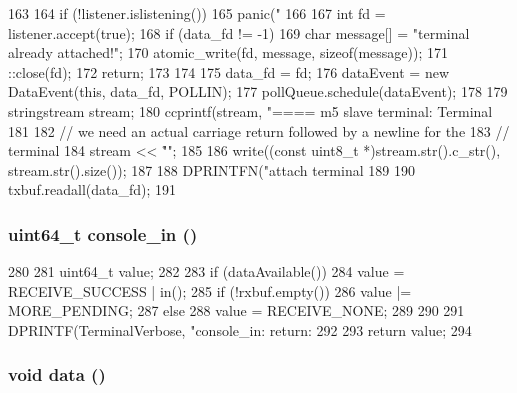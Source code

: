 \begin{DoxyCode}
163 {
164     if (!listener.islistening())
165         panic("%
166 
167     int fd = listener.accept(true);
168     if (data_fd != -1) {
169         char message[] = "terminal already attached!\n";
170         atomic_write(fd, message, sizeof(message));
171         ::close(fd);
172         return;
173     }
174 
175     data_fd = fd;
176     dataEvent = new DataEvent(this, data_fd, POLLIN);
177     pollQueue.schedule(dataEvent);
178 
179     stringstream stream;
180     ccprintf(stream, "==== m5 slave terminal: Terminal %
181 
182     // we need an actual carriage return followed by a newline for the
183     // terminal
184     stream << "\r\n";
185 
186     write((const uint8_t *)stream.str().c_str(), stream.str().size());
187 
188     DPRINTFN("attach terminal %
189 
190     txbuf.readall(data_fd);
191 }
\end{DoxyCode}
\hypertarget{classTerminal_abd9097353ba2e3b0552d2b731196e74a}{
\subsubsection[{console\_\-in}]{\setlength{\rightskip}{0pt plus 5cm}uint64\_\-t console\_\-in ()}}
\label{classTerminal_abd9097353ba2e3b0552d2b731196e74a}



\begin{DoxyCode}
280 {
281     uint64_t value;
282 
283     if (dataAvailable()) {
284         value = RECEIVE_SUCCESS | in();
285         if (!rxbuf.empty())
286             value  |= MORE_PENDING;
287     } else {
288         value = RECEIVE_NONE;
289     }
290 
291     DPRINTF(TerminalVerbose, "console_in: return: %
292 
293     return value;
294 }
\end{DoxyCode}
\hypertarget{classTerminal_a6617ba3e856d8b24979a2a44e5417172}{
\subsubsection[{data}]{\setlength{\rightskip}{0pt plus 5cm}void data ()}}
\label{classTerminal_a6617ba3e856d8b24979a2a44e5417172}



